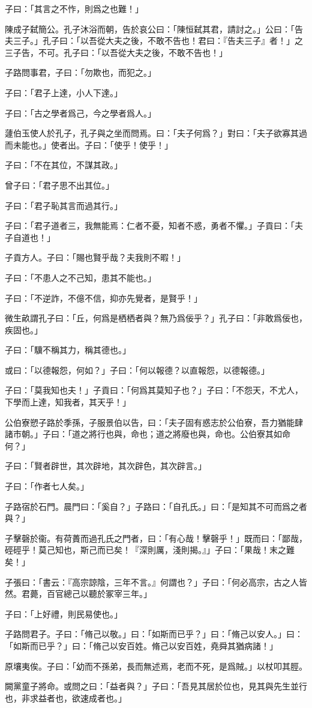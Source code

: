 子曰：「其言之不怍，則爲之也難！」

陳成子弑簡公。孔子沐浴而朝，告於哀公曰：「陳恒弑其君，請討之。」公曰：「告夫三子。」孔子曰：「以吾從大夫之後，不敢不告也！君曰：『告夫三子』者！」之三子告，不可。孔子曰：「以吾從大夫之後，不敢不告也！」

子路問事君，子曰：「勿欺也，而犯之。」

子曰：「君子上達，小人下達。」

子曰：「古之學者爲己，今之學者爲人。」

蘧伯玉使人於孔子，孔子與之坐而問焉。曰：「夫子何爲？」對曰：「夫子欲寡其過而未能也。」使者出。子曰：「使乎！使乎！」

子曰：「不在其位，不謀其政。」

曾子曰：「君子思不出其位。」

子曰：「君子恥其言而過其行。」

子曰：「君子道者三，我無能焉：仁者不憂，知者不惑，勇者不懼。」子貢曰：「夫子自道也！」

子貢方人。子曰：「賜也賢乎哉？夫我則不暇！」

子曰：「不患人之不己知，患其不能也。」

子曰：「不逆詐，不億不信，抑亦先覺者，是賢乎！」

微生畝謂孔子曰：「丘，何爲是栖栖者與？無乃爲佞乎？」孔子曰：「非敢爲佞也，疾固也。」

子曰：「驥不稱其力，稱其德也。」

或曰：「以德報怨，何如？」子曰：「何以報德？以直報怨，以德報德。」

子曰：「莫我知也夫！」子貢曰：「何爲其莫知子也？」子曰：「不怨天，不尤人，下學而上達，知我者，其天乎！」

公伯寮愬子路於季孫，子服景伯以告，曰：「夫子固有惑志於公伯寮，吾力猶能肆諸市朝。」子曰：「道之將行也與，命也；道之將廢也與，命也。公伯寮其如命何？」

子曰：「賢者辟世，其次辟地，其次辟色，其次辟言。」

子曰：「作者七人矣。」

子路宿於石門。晨門曰：「奚自？」子路曰：「自孔氏。」曰：「是知其不可而爲之者與？」

子擊磬於衞。有荷蕢而過孔氏之門者，曰：「有心哉！擊磬乎！」既而曰：「鄙哉，硜硜乎！莫己知也，斯己而已矣！『深則厲，淺則揭。』」子曰：「果哉！末之難矣！」

子張曰：「書云：『高宗諒陰，三年不言。』何謂也？」子曰：「何必高宗，古之人皆然。君薨，百官總己以聽於冢宰三年。」

子曰：「上好禮，則民易使也。」

子路問君子。子曰：「脩己以敬。」曰：「如斯而已乎？」曰：「脩己以安人。」曰：「如斯而已乎？」曰：「脩己以安百姓。脩己以安百姓，堯舜其猶病諸！」

原壤夷俟。子曰：「幼而不孫弟，長而無述焉，老而不死，是爲賊。」以杖叩其脛。

闕黨童子將命。或問之曰：「益者與？」子曰：「吾見其居於位也，見其與先生並行也，非求益者也，欲速成者也。」
